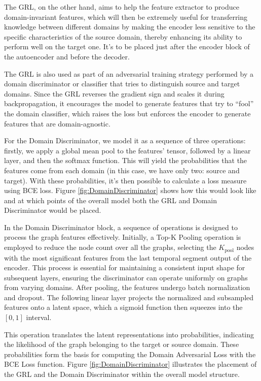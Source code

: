 The \gls{GRL}, on the other hand, aims to help the feature extractor to produce domain-invariant features, which will then be extremely useful for transferring knowledge between different domains by making the encoder less sensitive to the specific characteristics of the source domain, thereby enhancing its ability to perform well on the target one. It's to be placed just after the encoder block of the autoencoder and before the decoder.

The \gls{GRL} is also used as part of an adversarial training strategy performed by a domain discriminator or classifier that tries to distinguish source and target domains. Since the \gls{GRL} reverses the gradient sign and scales it during backpropagation, it encourages the model to generate features that try to ``fool'' the domain classifier, which raises the loss but enforces the encoder to generate features that are domain-agnostic.

For the Domain Discriminator, we model it as a sequence of three operations: firstly, we apply a global mean pool to the features' tensor, followed by a linear layer, and then the softmax function. This will yield the probabilities that the features come from each domain (in this case, we have only two: source and target). With these probabilities, it's then possible to calculate a loss measure using \gls{BCE} loss. Figure \ref{fig:DomainDiscriminator} shows how this would look like and at which points of the overall model both the \gls{GRL} and Domain Discriminator would be placed.

In the Domain Discriminator block, a sequence of operations is designed to process the graph features effectively. Initially, a Top-K Pooling operation is employed to reduce the node count over all the graphs, selecting the $K_\text{pool}$ nodes with the most significant features from the last temporal segment output of the encoder. This process is essential for maintaining a consistent input shape for subsequent layers, ensuring the discriminator can operate uniformly on graphs from varying domains. After pooling, the features undergo batch normalization and dropout. The following linear layer projects the normalized and subsampled features onto a latent space, which a sigmoid function then squeezes into the $[0, 1]$ interval.

This operation translates the latent representations into probabilities, indicating the likelihood of the graph belonging to the target or source domain. These probabilities form the basis for computing the Domain Adversarial Loss with the \gls{BCE} Loss function. Figure \ref{fig:DomainDiscriminator} illustrates the placement of the \gls{GRL} and the Domain Discriminator within the overall model structure.


